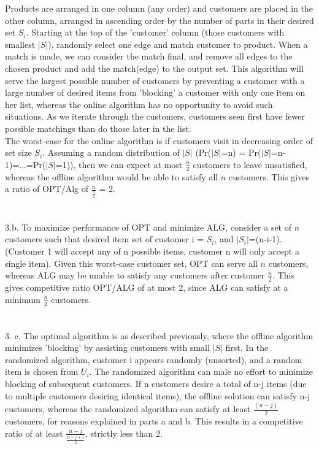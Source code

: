 \documentclass[11pt, oneside]{article}   	%
\begin{document}
\indent Products are arranged in one column (any order) and customers are placed in the other column, arranged in ascending order by the number of parts in their desired set $S_i$.  Starting at the top of the 'customer' column (those customers with smallest $|S|$), randomly select one edge and match customer to product.  When a match is made, we can consider the match final, and remove all edges to the chosen product and add the match(edge) to the output set.  This algorithm will serve the largest possible number of customers by preventing a customer with a large number of desired items from 'blocking' a customer with only one item on her list, whereas the online algorithm has no opportunity to avoid such situations.  As we iterate through the customers, customers seen first have fewer possible matchings than do those later in the list.\\
\indent The worst-case for the online algorithm is if customers visit in decreasing order of set size $S_i$.  Assuming a random distribution of $|S|$ (Pr($|S|$=n) = Pr($|S|$=n-1)=...=Pr($|S|$=1)), then we can expect at most $\frac{n}{2}$ customers to leave unsatisfied, whereas the offline algorithm would be able to satisfy all $n$ customers.  This gives a ratio of OPT/Alg of $\frac{n}{\frac{n}{2}}$ = 2.\\\\\\
3.b.  To maximize performance of OPT and minimize ALG, consider a set of $n$ customers such that desired item set of customer i = $S_i$, and $|S_i|$=(n-i-1).  (Customer 1 will accept any of n possible items, customer n will only accept a single item).  Given this worst-case customer set, OPT can serve all $n$ customers, whereas ALG may be unable to satisfy any customers after customer $\frac{n}{2}$.  This gives competitive ratio OPT/ALG of at most 2, since ALG can satisfy at a minimum $\frac{n}{2}$ customers.\\\\\\
3.  c.  The optimal algorithm is as described previously, where the offline algorithm minimizes 'blocking' by assisting customers with small $|S|$ first.  In the randomized algorithm, customer i appears randomly (unsorted), and a random item is chosen from $U_i$.  The randomized algorithm can male no effort to minimize blocking of subsequent customers.  If n customers desire a total of n-j items (due to multiple customers desiring identical items), the offline solution can satisfy n-j customers, whereas the randomized algorithm can satisfy at least $\frac{(n-j)}{2}$ customers, for reasons explained in parts a and b.  This results in a competitive ratio of at least $\frac{n-j}{\frac{n-j+1}{2}}$, strictly less than 2.\\\\\\
\end{document}
